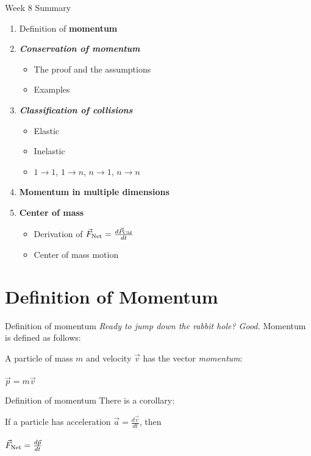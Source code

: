 \documentclass{beamer}
\begin{document}
\begin{frame}{Week 8 Summary}
\begin{enumerate}
\item Definition of \alert{\textbf{momentum}}
\item \alert{\textbf{\textit{Conservation of momentum}}}
\begin{itemize}
\item The proof and the assumptions
\item Examples
\end{itemize}
\item \alert{\textbf{\textit{Classification of collisions}}}
\begin{itemize}
\item Elastic
\item Inelastic
\item $1 \rightarrow 1$, $1 \rightarrow n$, $n \rightarrow 1$, $n \rightarrow n$
\end{itemize}
\item \textbf{Momentum in multiple dimensions}
\item \textbf{Center of mass}
\begin{itemize}
\item Derivation of $\vec{F}_{\rm Net} = \frac{d\vec{P}_{\rm CM}}{dt}$
\item Center of mass motion
\end{itemize}
\end{enumerate}
\end{frame}

\section{Definition of Momentum}

\begin{frame}{Definition of momentum}
\textit{Ready to jump down the rabbit hole?  Good.}  Momentum is defined as follows: \\ \vspace{1cm}
\begin{tcolorbox}[colback=white,colframe=red!40!blue,title=Definition of Momentum]
\alert{A particle of mass $m$ and velocity $\vec{v}$ has the vector \textit{momentum}:} \\ \\
\alert{$\vec{p} = m\vec{v}$}
\end{tcolorbox}
\end{frame}

\begin{frame}{Definition of momentum}
There is a corollary: \\ \vspace{1cm}
\begin{tcolorbox}[colback=white,colframe=red!40!blue,title=Newton's Second Law with momentum]
\alert{If a particle has acceleration $\vec{a} = \frac{d\vec{v}}{dt}$, then} \\ \\
\alert{$\vec{F}_{\rm Net} = \frac{d\vec{p}}{dt}$}
\end{tcolorbox}
\end{frame}
\end{document}
